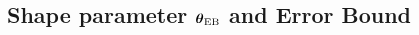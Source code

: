 \documentclass[handout, 10pt,compress,xcolor={usenames,dvipsnames}]{beamer} %
\newcommand{\bm}[1]{\boldsymbol{#1}}
\renewcommand{\mLambda}{\Lambda}
\newcommand{\MLE}{\textup{EB}}
\newcommand{\vC}{\bvec{C}}
\newcommand{\mCthetaInv}{{\mathsf{C}^{-1}_{\vtheta}}}
\newcommand{\vthetaMLE}{{\vtheta}_{\MLE}}
\renewcommand{\vtheta}{{\bm{\theta}}}
\newcommand{\pause}{}
\newcommand{\redroundmathbox}[1]{\parbox{\widthof{$#1$\hspace{1em}}}
	{\begin{mdframed}[style=redshade]\centering $#1$ \end{mdframed}}}
\begin{document}

\subsection{Shape parameter $\vthetaMLE$ and Error Bound}
\end{document}
